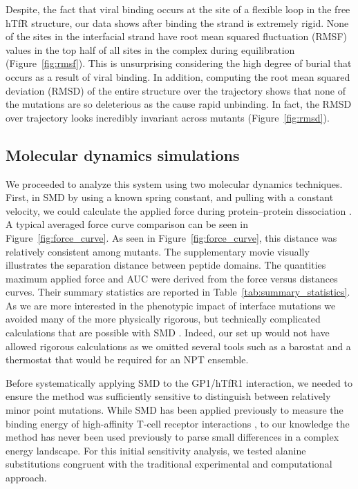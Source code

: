 \documentclass[12pt]{article}
\begin{document}
Despite, the fact that viral binding occurs at the site of a flexible loop in the free hTfR structure, our data shows after binding the strand is extremely rigid. None of the sites in the interfacial strand have root mean squared fluctuation (RMSF) values in the top half of all sites in the complex during equilibration (Figure~\ref{fig:rmsf}). This is unsurprising considering the high degree of burial that occurs as a result of viral binding. In addition, computing the root mean squared deviation (RMSD) of the entire structure over the trajectory shows that none of the mutations are so deleterious as the cause rapid unbinding. In fact, the RMSD over trajectory looks incredibly invariant across mutants (Figure~\ref{fig:rmsd}).

\subsection{Molecular dynamics simulations}

We proceeded to analyze this system using two molecular dynamics techniques. First, in SMD by using a known spring constant, and pulling with a constant velocity, we could calculate the applied force during protein--protein dissociation \citep{Cuendet2008,Cuendet2011}. A typical averaged force curve comparison can be seen in Figure~\ref{fig:force_curve}. As seen in Figure~\ref{fig:force_curve}, this distance was relatively consistent among mutants. The supplementary movie visually illustrates the separation distance between peptide domains. The quantities maximum applied force and AUC were derived from the force versus distances curves. Their summary statistics are reported in Table~\ref{tab:summary_statistics}. As we are more interested in the phenotypic impact of interface mutations we avoided many of the more physically rigorous, but technically complicated calculations that are possible with SMD \citep{Is2001A,Is2001B}. Indeed, our set up would not have allowed rigorous calculations as we omitted several tools such as a barostat and a thermostat that would be required for an NPT ensemble.

Before systematically applying SMD to the GP1/hTfR1 interaction, we needed to ensure the method was sufficiently sensitive to distinguish between relatively minor point mutations. While SMD has been applied previously to measure the binding energy of high-affinity T-cell receptor interactions \citep{Cuendet2008,Cuendet2011}, to our knowledge the method has never been used previously to parse small differences in a complex energy landscape. For this initial sensitivity analysis, we tested alanine substitutions congruent with the traditional experimental and computational approach. 
\end{document}
